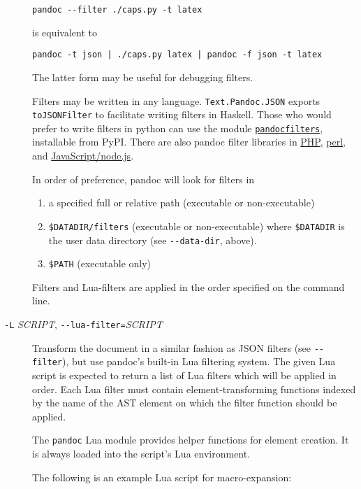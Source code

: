 \documentclass[]{article}
\begin{document}
\begin{description}
\begin{verbatim}
pandoc --filter ./caps.py -t latex
\end{verbatim}

is equivalent to

\begin{verbatim}
pandoc -t json | ./caps.py latex | pandoc -f json -t latex
\end{verbatim}

The latter form may be useful for debugging filters.

Filters may be written in any language. \texttt{Text.Pandoc.JSON}
exports \texttt{toJSONFilter} to facilitate writing filters in Haskell.
Those who would prefer to write filters in python can use the module
\href{https://github.com/jgm/pandocfilters}{\texttt{pandocfilters}},
installable from PyPI. There are also pandoc filter libraries in
\href{https://github.com/vinai/pandocfilters-php}{PHP},
\href{https://metacpan.org/pod/Pandoc::Filter}{perl}, and
\href{https://github.com/mvhenderson/pandoc-filter-node}{JavaScript/node.js}.

In order of preference, pandoc will look for filters in

\begin{enumerate}
\def\labelenumi{\arabic{enumi}.}
\item
  a specified full or relative path (executable or non-executable)
\item
  \texttt{\$DATADIR/filters} (executable or non-executable) where
  \texttt{\$DATADIR} is the user data directory (see
  \texttt{-\/-data-dir}, above).
\item
  \texttt{\$PATH} (executable only)
\end{enumerate}

Filters and Lua-filters are applied in the order specified on the
command line.
\item[\texttt{-L} \emph{SCRIPT}, \texttt{-\/-lua-filter=}\emph{SCRIPT}]
Transform the document in a similar fashion as JSON filters (see
\texttt{-\/-filter}), but use pandoc's built-in Lua filtering system.
The given Lua script is expected to return a list of Lua filters which
will be applied in order. Each Lua filter must contain
element-transforming functions indexed by the name of the AST element on
which the filter function should be applied.

The \texttt{pandoc} Lua module provides helper functions for element
creation. It is always loaded into the script's Lua environment.

The following is an example Lua script for macro-expansion:


\end{description}
\end{document}
